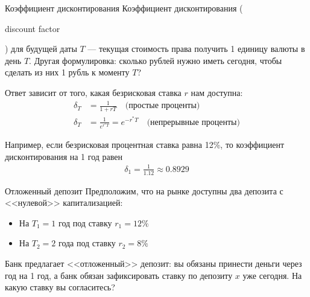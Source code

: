\documentclass{beamer}
\newcommand{\en}[1]{\begin{otherlanguage}{english}#1\end{otherlanguage}}
\begin{document}
\begin{frame}{Коэффициент дисконтирования}
\justify
\alert{Коэффициент дисконтирования} (\en{discount factor}) для будущей даты $T$ --- текущая стоимость права получить 1 единицу валюты в день $T$. Другая формулировка: сколько рублей нужно иметь сегодня, чтобы сделать из них 1 рубль к моменту $T$?

\justify
Ответ зависит от того, какая безрисковая ставка $r$ нам доступна:
\begin{align*}
\delta_T &= \frac{1}{1 + rT} \quad \text{(простые проценты)} \\
\delta_T &= \frac{1}{e^{r^*T}} = e^{-r^*T} \quad \text{(непрерывные проценты)}
\end{align*}

\justify
Например, если безрисковая процентная ставка равна 12\%, то коэффициент дисконтирования на 1 год равен
\begin{align*}
\delta_1 = \frac{1}{1.12} \approx 0.8929
\end{align*}
\end{frame}



\begin{frame}{Отложенный депозит}
\justify
Предположим, что на рынке доступны два депозита с <<нулевой>> капитализацией:
\begin{itemize}
\item На $T_1=1$ год под ставку $r_1=12\%$ 
\item На $T_2=2$ года под ставку $r_2=8\%$ 
\end{itemize}

Банк предлагает <<отложенный>> депозит: вы обязаны принести деньги через год на 1 год, а банк обязан зафиксировать ставку по депозиту $x$ уже сегодня. На какую ставку вы согласитесь?

\centering
{}
\end{frame}
\end{document}
